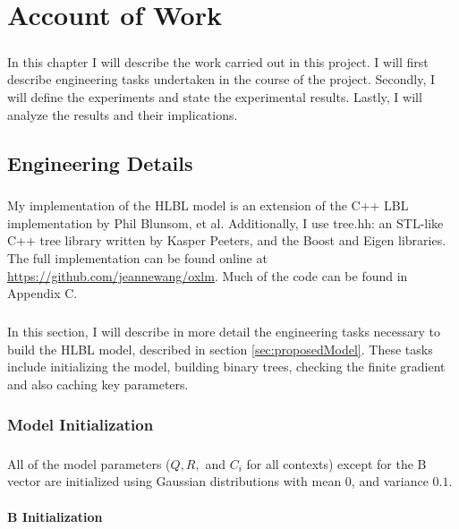 \documentclass[12pt]{ociamthesis}  %
\begin{document}
\chapter{Account of Work}
\paragraph{}
In this chapter I will describe the work carried out in this project. I will first describe engineering tasks undertaken in the course of the project. Secondly, I will define the experiments and state the experimental results. Lastly, I will analyze the results and their implications.

\section{Engineering Details}
\paragraph{}
My implementation of the HLBL model is an extension of the C++ LBL implementation by Phil Blunsom, et al. Additionally, I use tree.hh: an STL-like C++ tree library written by Kasper Peeters, and the Boost \cite{BoostSite} and Eigen \cite{eigenweb} libraries. The full implementation can be found online at \url{https://github.com/jeannewang/oxlm}. Much of the code can be found in Appendix C.
\paragraph{}
In this section, I will describe in more detail the engineering tasks necessary to build the HLBL model, described in section \ref{sec:proposedModel}. These tasks include initializing the model, building binary trees, checking the finite gradient and also caching key parameters.

\subsection{Model Initialization}
\paragraph{}
All of the model parameters ($Q,R,$ and $C_i$ for all contexts) except for the B vector are initialized using Gaussian distributions with mean $0$, and variance $0.1$.
\subsubsection{B Initialization}
\end{document}
